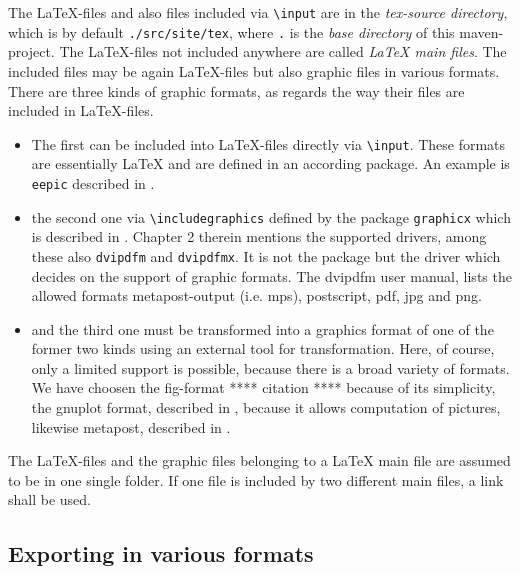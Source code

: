 \documentclass[12pt]{article}
\begin{document}
The \LaTeX-files and also files included via {\tt\textbackslash input} 
are in the {\em tex-source directory}, 
which is by default {\tt./src/site/tex}, 
where {\tt.} is the {\em base directory} of this maven-project. 
The \LaTeX-files not included anywhere are called {\em \LaTeX{} main files}. 
The included files may be again \LaTeX-files but also graphic files 
in various formats. 
There are three kinds of graphic formats, 
as regards the way their files are included in \LaTeX-files. 
%
\begin{itemize}
\item
The first can be included into \LaTeX-files directly 
via {\tt\textbackslash input}. 
These formats are essentially \LaTeX{} and are defined in an according package. 
An example is {\tt eepic} described in \cite{EEpic}. 
\item
the second one via {\tt\textbackslash includegraphics} 
defined by the package {\tt graphicx} 
which is described in \cite{GraX}. 
Chapter 2 therein mentions the supported drivers, 
among these also {\tt dvipdfm} and {\tt dvipdfmx}. 
It is not the package but the driver 
which decides on the support of graphic formats. 
The dvipdfm user manual, \cite{DviPdfMx} lists the allowed formats 
metapost-output (i.e. \gls{mps}), postscript, 
\gls{pdf}, \gls{jpg} and \gls{png}. 
\item
and the third one must be transformed into a graphics format 
of one of the former two kinds using an external tool for transformation. 
Here, of course, only a limited support is possible, 
because there is a broad variety of formats. 
We have choosen the \gls{fig}-format **** citation **** because of its simplicity, 
the gnuplot format, described in \cite{GnuPlot}, 
because it allows computation of pictures, 
likewise metapost, described in \cite{MPost}. 
\end{itemize}

The \LaTeX-files and the graphic files belonging to a \LaTeX{} main file 
are assumed to be in one single folder. 
If one file is included by two different main files, 
a link shall be used. 


\subsection{Exporting in various formats}\label{sec:stableUsage}
\end{document}
